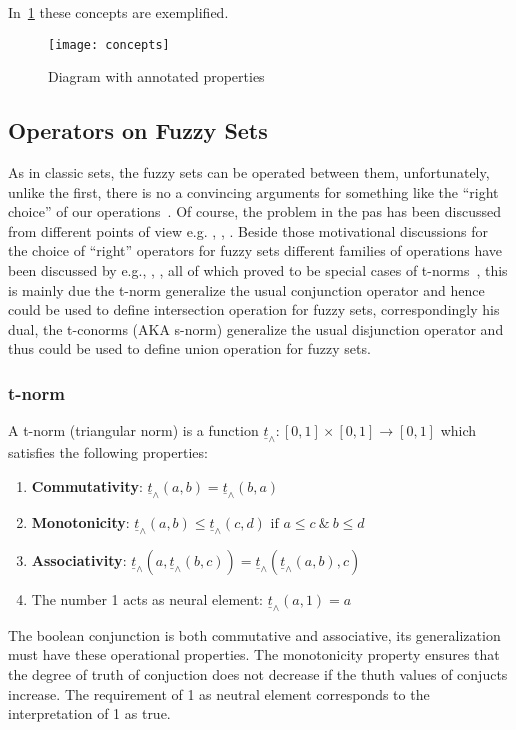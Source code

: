 \documentclass[]{article}
\newcommand{\tnorm}{\underline{t}_{\land}}
\begin{document}
In~\ref{fig:concepts} these concepts are exemplified.

\begin{figure}[ht!]
  \centering
  \texttt{[image: concepts]} %
  \caption{Diagram with annotated properties\label{fig:concepts}}
\end{figure}

\subsection{Operators on Fuzzy Sets}
As in classic sets, the fuzzy sets can be operated between them, unfortunately,
unlike the first, there is no a convincing arguments for something like the
``right choice'' of our operations~\citep{Zadeh1965}. Of course, the problem in
the pas has been discussed from different points of view e.g. \citet{Bellman1973},
\citet{Yager1979}, \citet{Giles1979}. Beside those motivational discussions for
the choice of ``right'' operators for fuzzy sets different families of operations
have been discussed by e.g.\citet{Yager1980}, \citet{Dombi1982}, \citet{Weber1983},
all of which proved to be special cases of t-norms~\citep{Schweizer1961}, this is
mainly due the t-norm generalize the usual conjunction operator and hence could
be used to define intersection operation for fuzzy sets, correspondingly his dual,
the t-conorms (AKA s-norm) generalize the usual disjunction operator and thus
could be used to define union operation for fuzzy sets.
\subsubsection{t-norm~\citep{Schweizer1961}}
A t-norm (triangular norm) is a function $\tnorm: [0, 1] \times [0, 1] \to [0, 1] $
which satisfies the following properties:
\begin{enumerate}
  \item \textbf{Commutativity}: $\tnorm(a, b) = \tnorm(b, a)$
  \item \textbf{Monotonicity}: $\tnorm(a, b) \leq \tnorm(c, d)\text{ if } a \leq c\ \&\ b \leq d$
  \item \textbf{Associativity}: $\tnorm(a, \tnorm(b, c)) = \tnorm(\tnorm(a, b), c)$
  \item The number 1 acts as neural element: $\tnorm(a, 1) = a$
\end{enumerate}
The boolean conjunction is both commutative and associative, its generalization
must have these operational properties. The monotonicity property ensures that
the degree of truth of conjuction does not decrease if the thuth values of
conjucts increase. The requirement of 1 as neutral element corresponds to the
interpretation of 1 as true.
\end{document}
